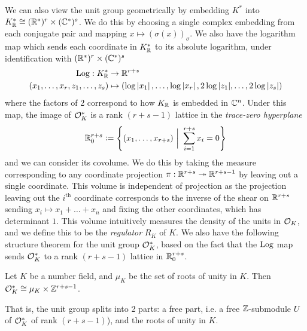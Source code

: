 \documentclass[11pt]{report}
\begin{document}


We can also view the unit group geometrically by embedding $K^*$ into $K_{\mathbb{R}}^* \cong (\mathbb{R}^*)^r \times (\mathbb{C}^*)^s$. We do this by choosing a single complex embedding from each conjugate pair and mapping $x \mapsto (\sigma(x))_{\sigma}$. We also have the logarithm map which sends each coordinate in $K_{\mathbb{R}}^*$ to its absolute logarithm, under identification with $(\mathbb{R}^*)^r \times (\mathbb{C}^*)^s$
\begin{align*}
    \operatorname{Log} : K_{\mathbb{R}}^* &\to \mathbb{R}^{r + s} \\
    (x_1, \ldots, x_r, z_1, \ldots, z_s) &\mapsto (\log\left| x_1 \right|, \ldots, \log\left| x_r \right|, 2\log{\left| z_1 \right|}, \ldots, 2\log{\left| z_s \right|})
\end{align*}
where the factors of 2 correspond to how $K_{\mathbb{R}}$ is embedded in $\mathbb{C}^n$. 
Under this map, the image of $\mathcal{O}_K^*$ is a rank $(r + s - 1)$ lattice in the \emph{trace-zero hyperplane}
$$
    \mathbb{R}_0^{r + s} \vcentcolon= \left\{  (x_1, \ldots, x_{r + s}) \ \bigg| \ \sum_{i = 1}^{r + s}x_i = 0  \right\}
$$
and we can consider its covolume. We do this by taking the measure corresponding to any coordinate projection $\pi : \mathbb{R}^{r + s} \twoheadrightarrow \mathbb{R}^{r + s - 1}$ by leaving out a single coordinate. This volume is independent of projection as the projection leaving out the $i^{\text{th}}$ coordinate corresponds to the inverse of the shear on $\mathbb{R}^{r + s}$ sending $x_i \mapsto x_1 + \ldots + x_n$ and fixing the other coordinates, which has determinant $1$. This volume intuitively measures the density of the units in $\mathcal{O}_K$, and we define this to be the \emph{regulator} $R_K$ of $K$. We also have the following structure theorem for the unit group $\mathcal{O}_K^*$, based on the fact that the $\operatorname{Log}$ map sends $\mathcal{O}_K^*$ to a rank $(r + s - 1)$ lattice in $\mathbb{R}_0^{r + s}$.
\begin{theorem}\label{dirunit}
    Let $K$ be a number field, and $\mu_K$ be the set of roots of unity in $K$. Then $\mathcal{O}_K^* \cong \mu_K \times \mathbb{Z}^{r + s - 1}$.
\end{theorem}
That is, the unit group splits into 2 parts: a free part, i.e. a free $\mathbb{Z}$-submodule $U$ of $\mathcal{O}_K^*$ of rank $(r + s - 1)$), and the roots of unity in $K$.
\end{document}
